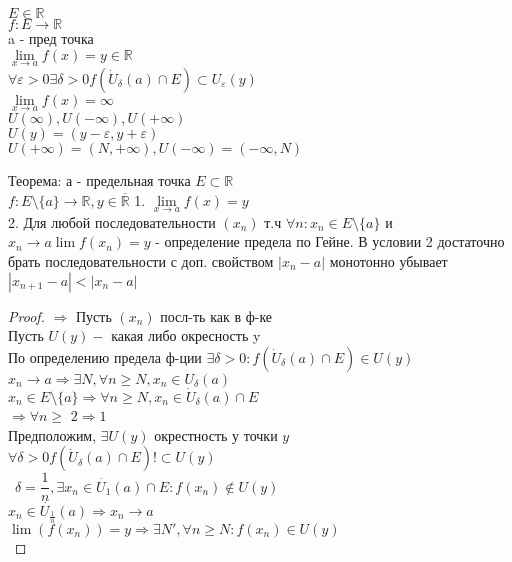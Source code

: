 
$ E \in \mathbb{R} $ \\
$ f : E \rightarrow \mathbb{R } $\\
a - пред точка \\	
$ \lim\limits_{x \rightarrow a} f(x) = y \in \mathbb{R}$ \\
$ \forall \varepsilon > 0 \exists \delta > 0 f(\dot{U}_{\delta} (a) \cap E) \subset U_{\varepsilon} (y) $ \\
$ \lim\limits_{x \rightarrow a} f(x) = \infty $\\
$ U(\infty), U(-\infty), U(+\infty) $ \\
$ U(y) = (y-\varepsilon, y+\varepsilon) $ \\
$ U(+\infty) = (N, +\infty), U(-\infty) = (-\infty, N) $ \\

\begin{theorem}
Теорема: а - предельная точка  $ E \subset \mathbb{R} $ \\
$ f : E \setminus \{a\} \rightarrow \mathbb{R}, y \in \overline{\mathbb{R}}$
1. $ \lim\limits_{x \rightarrow a} f(x) = y $ \\
2. Для любой последовательности $(x_n)$ т.ч $\forall n : x_n \in E \setminus \{a\} $ и $ x_n \rightarrow a  \lim f(x_n) = y $ - определение предела по Гейне.
В условии 2 достаточно брать последовательности с доп. свойством $ | x_n - a | $ монотонно убывает $ |x_{n+1} - a | < | x_n - a | $ 
\begin{proof}
	$ \Rightarrow $ Пусть $(x_n)$ посл-ть как в ф-ке \\
	Пусть $ U(y) - $ какая либо окресность y \\
	По определению предела ф-ции $ \exists \delta > 0 : f(\dot{U}_{\delta} (a) \cap E)  \in U(y) $ \\
	$ x_n \rightarrow a \Rightarrow \exists N, \forall n \geq N, x_n \in U_{\delta} (a)$ \\
	$ x_n \in E \setminus \{a\} \Rightarrow \forall n \geq N, x_n \in \dot{U}_{\delta} (a) \cap E$ \\
	$ \Rightarrow \forall n \geq $
	$ 2 \Rightarrow 1 $ \\
	Предположим, $ \exists U(y) $ окрестность у точки $ y$ \\
	$ \forall \delta > 0 f(\dot{U}_{\delta} (a) \cap E)  !\subset U(y)$\\\
	$ \delta = \dfrac{1}{n}, \exists x_n \in \dot{U_1} (a) \cap E : f(x_n) \notin U(y) $ \\
	$ x_n \in \dot{U_{\frac{1}{n}}} (a) \Rightarrow x_n \rightarrow a $ \\
	$ \lim(f(x_n)) = y \Rightarrow \exists N', \forall n \geq N : f(x_n) \in U(y) $ \\
	
\end{proof}
\end{theorem}

